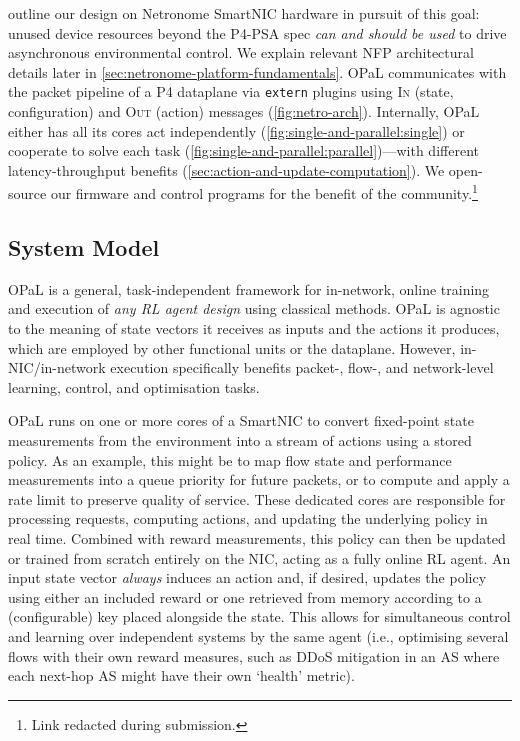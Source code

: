 \documentclass[
conference
,10pt
]{IEEEtran}
\newcommand{\approachshort}{OPaL}
\newcommand{\inring}{\textsc{In}}
\newcommand{\outring}{\textsc{Out}}
\begin{document}
 outline our design on Netronome SmartNIC hardware in pursuit of this goal: unused device resources beyond the P4-PSA spec \emph{can and should be used} to drive asynchronous environmental control.
We explain relevant NFP architectural details later in \cref{sec:netronome-platform-fundamentals}.
\approachshort{} communicates with the packet pipeline of a P4 dataplane via \texttt{extern} plugins using \inring{} (state, configuration) and \outring{} (action) messages (\cref{fig:netro-arch}).
Internally, \approachshort{} either has all its cores act independently (\cref{fig:single-and-parallel:single}) or cooperate to solve each task (\cref{fig:single-and-parallel:parallel})---with different latency-throughput benefits (\cref{sec:action-and-update-computation}).
We open-source our firmware and control programs for the benefit of the community.\footnote{Link redacted during submission.}

\subsection{System Model}
\approachshort{} is a general, task-independent framework for in-network, online training and execution of \emph{any RL agent design} using classical methods.
\approachshort{} is agnostic to the meaning of state vectors it receives as inputs and the actions it produces, which are employed by other functional units or the dataplane.
However, in-NIC/in-network execution specifically benefits packet-, flow-, and network-level learning, control, and optimisation tasks.

\approachshort{} runs on one or more cores of a SmartNIC to convert fixed-point state measurements from the environment into a stream of actions using a stored policy.
As an example, this might be to map flow state and performance measurements into a queue priority for future packets, or to compute and apply a rate limit to preserve quality of service.
These dedicated cores are responsible for processing requests, computing actions, and updating the underlying policy in real time.
Combined with reward measurements, this policy can then be updated or trained from scratch entirely on the NIC, acting as a fully online RL agent.
An input state vector \emph{always} induces an action and, if desired, updates the policy using either an included reward or one retrieved from memory according to a (configurable) key placed alongside the state.
This allows for simultaneous control and learning over independent systems by the same agent (i.e., optimising several flows with their own reward measures, such as DDoS mitigation in an AS where each next-hop AS might have their own `health' metric).
\end{document}
